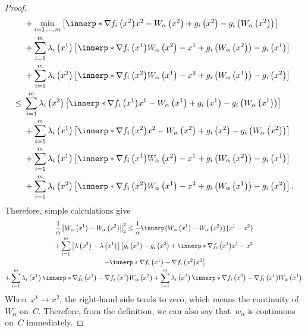 \documentclass[../../main]{subfiles}
\begin{document}
\begin{proof}
\begin{align}
                  &+ \min_{i = 1, \dots, m} \left[ \innerp*{\nabla f_i\left(x^2\right)}{x^2 - W_\alpha\left(x^2\right)} + g_i\left(x^2\right) - g_i\left(W_\alpha\left(x^2\right)\right) \right] \\
                  &+ \sum_{i = 1}^{m} \lambda_i\left(x^1\right) \left[ \innerp*{\nabla f_i\left(x^1\right)}{W_\alpha\left(x^2\right) - x^1} + g_i\left(W_\alpha\left(x^2\right)\right) - g_i\left(x^1\right) \right] \\
                  &+ \sum_{i = 1}^{m} \lambda_i\left(x^2\right) \left[ \innerp*{\nabla f_i\left(x^2\right)}{W_\alpha\left(x^1\right) - x^2} + g_i\left(W_\alpha\left(x^1\right)\right) - g_i\left(x^2\right) \right] \\
             \le{}& \sum_{i = 1}^{m} \lambda_i\left(x^2\right) \left[ \innerp*{\nabla f_i\left(x^1\right)}{x^1 - W_\alpha\left(x^1\right)} + g_i\left(x^1\right) - g_i\left(W_\alpha\left(x^1\right)\right) \right] \\
                  &+ \sum_{i = 1}^{m} \lambda_i\left(x^1\right) \left[ \innerp*{\nabla f_i\left(x^2\right)}{x^2 - W_\alpha\left(x^2\right)} + g_i\left(x^2\right) - g_i\left(W_\alpha\left(x^2\right)\right) \right] \\
                  &+ \sum_{i = 1}^{m} \lambda_i\left(x^1\right) \left[ \innerp*{\nabla f_i\left(x^1\right)}{W_\alpha\left(x^2\right) - x^1} + g_i\left(W_\alpha\left(x^2\right)\right) - g_i\left(x^1\right) \right] \\
                  &+ \sum_{i = 1}^{m} \lambda_i\left(x^2\right) \left[ \innerp*{\nabla f_i\left(x^2\right)}{W_\alpha\left(x^1\right) - x^2} + g_i\left(W_\alpha\left(x^1\right)\right) - g_i\left(x^2\right) \right]
              .\end{align}
              Therefore, simple calculations give
              \begin{multline} \label{eq:cont_w_alpha:cont}
                  \frac{1}{\alpha} \norm*{W_\alpha\left(x^1\right) - W_\alpha\left(x^2\right)}_2^2 \le \frac{1}{\alpha} \innerp{W_\alpha\left(x^1\right) - W_\alpha\left(x^2\right)}{x^1 - x^2} \\
                  + \sum_{i = 1}^{m} \left[ \lambda\left(x^2\right) - \lambda\left(x^1\right) \right] \left[ g_i\left(x^1\right) - g_i\left(x^2\right) + \innerp*{\nabla f_i\left(x^1\right)}{x^1 - x^2} \right. \\
                  \left. - \innerp*{\nabla f_i\left(x^1\right) - \nabla f_i\left(x^2\right)}{x^2} \right] \\
                  + \sum_{i = 1}^{m} \lambda_i\left(x^1\right) \innerp*{\nabla f_i\left(x^1\right) - \nabla f_i\left(x^2\right)}{W_\alpha\left(x^2\right)}
                  + \sum_{i = 1}^{m} \lambda_i\left(x^2\right) \innerp*{\nabla f_i\left(x^2\right) - \nabla f_i\left(x^1\right)}{W_\alpha\left(x^1\right)}
              .\end{multline}
              When~$x^1 \to x^2$, the right-hand side tends to zero, which means the continuity of~$W_\alpha$ on~$C$.
              Therefore, from the definition, we can also say that~$w_\alpha$ is continuous on~$C$ immediately.


\end{proof}
\end{document}
